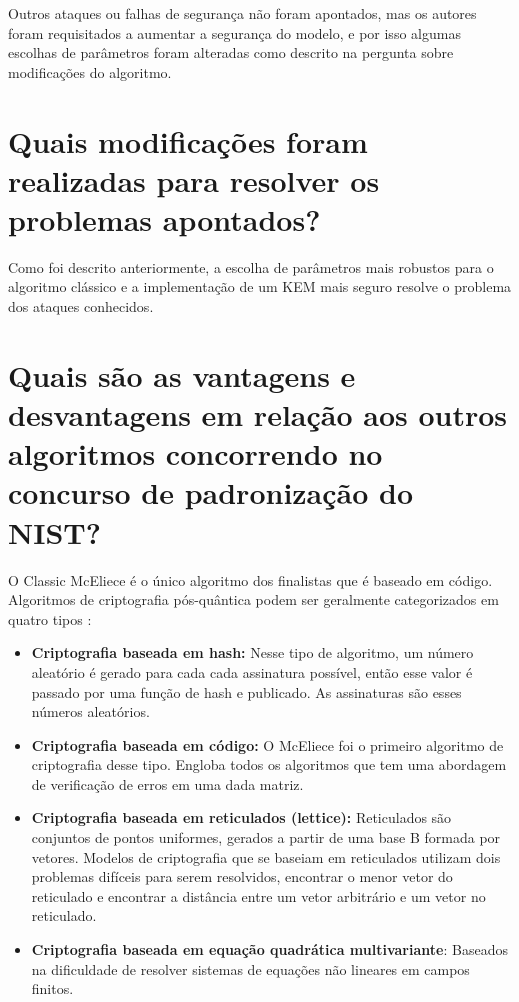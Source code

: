 Outros ataques ou falhas de segurança não foram apontados, mas os autores foram requisitados a aumentar a segurança do modelo, e por isso algumas escolhas de parâmetros foram alteradas como descrito na pergunta sobre modificações do algoritmo.

\section*{Quais modificações foram realizadas para resolver os problemas apontados?}

Como foi descrito anteriormente, a escolha de parâmetros mais robustos para o algoritmo clássico e a implementação de um KEM mais seguro resolve o problema dos ataques conhecidos.

\section*{Quais são as vantagens e desvantagens em relação aos outros algoritmos concorrendo no concurso de padronização do NIST?}

O Classic McEliece é o único algoritmo dos finalistas que é baseado em código. Algoritmos de criptografia pós-quântica podem ser geralmente categorizados em quatro tipos \cite{criptTypes}:

\begin{itemize}
    \item \textbf{Criptografia baseada em hash:} Nesse tipo de algoritmo, um número aleatório é gerado para cada cada assinatura possível, então esse valor é passado por uma função de hash e publicado. As assinaturas são esses números aleatórios.
    
    \item \textbf{Criptografia baseada em código:} O McEliece foi o primeiro algoritmo de criptografia desse tipo. Engloba todos os algoritmos que tem uma abordagem de verificação de erros em uma dada matriz. 
    
    \item \textbf{Criptografia baseada em reticulados (lettice):} Reticulados são conjuntos de pontos uniformes, gerados a partir de uma base B formada por vetores. Modelos de criptografia que se baseiam em reticulados utilizam dois problemas difíceis para serem resolvidos, encontrar o menor vetor do reticulado e encontrar a distância entre um vetor arbitrário e um vetor no reticulado.
    
    \item \textbf{Criptografia baseada em equação quadrática multivariante}: Baseados na dificuldade de resolver sistemas de equações não lineares em campos finitos.
\end{itemize}


